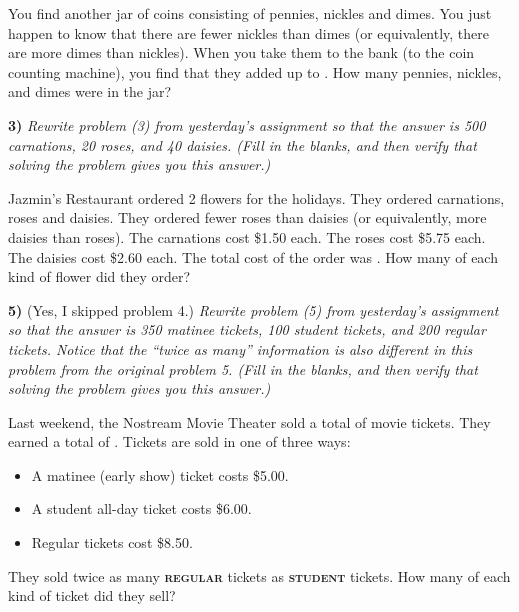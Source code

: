 \documentclass[10pt,letterpaper]{memoir}
\begin{document}
You find another jar of  coins consisting of pennies, nickles and dimes.
You just happen to know that there are  fewer nickles than dimes
(or equivalently, there are  more dimes than nickles).
When you take them to the bank (to the coin counting machine),
you find that they added up to .
How many pennies, nickles, and dimes were in the jar?

\myWideMatrixTable[-0.1in]

\vspace{0.5in}


\newpage
{\bfseries\large 3)} 
{\itshape
Rewrite problem (3) from yesterday's assignment so that 
the answer is 500 carnations, 20 roses, and 40 daisies. (Fill in the blanks, and then verify 
that solving the problem gives you this answer.)
}

Jazmin's Restaurant ordered 2 flowers for the holidays.
They ordered carnations, roses and daisies.
They ordered  fewer roses than daisies
(or equivalently,  more daisies than roses).
The carnations cost \$1.50 each.
The roses cost \$5.75 each.
The daisies cost \$2.60 each.
The total cost of the order was .
How many of each kind of flower did they order?

\myWideMatrixTable[-0.1in]

\vspace{0.5in}
\vfill





{\bfseries\large 5)} (Yes, I skipped problem 4.)
{\itshape
Rewrite problem (5) from yesterday's assignment so that 
the answer is 350 matinee tickets, 100 student tickets, and 200 regular tickets. 
Notice that the ``twice as many'' information is also different in this problem 
from the original problem 5.
(Fill in the blanks, and then verify 
that solving the problem gives you this answer.)
}

Last weekend, the Nostream Movie Theater sold a total of  movie tickets.
They earned a total of .
Tickets are sold in one of three ways:
\begin{itemize}[itemsep=0in]
    \item A matinee (early show) ticket costs \$5.00.
    \item A student all-day ticket costs \$6.00.
    \item Regular tickets cost \$8.50.
\end{itemize}
They sold twice as many {\bfseries\scshape regular} tickets as {\bfseries\scshape student} tickets.
How many of each kind of ticket did they sell?
\end{document}
